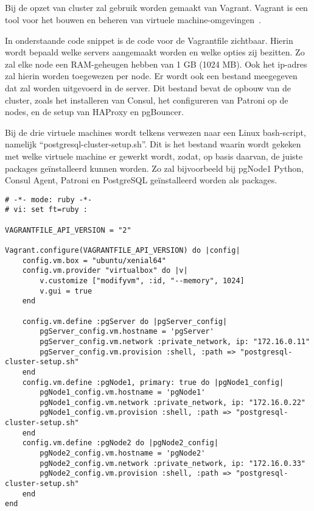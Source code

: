 \subsection{}
\label{subsec:Vagrant}
Bij de opzet van cluster zal gebruik worden gemaakt van Vagrant. Vagrant is een tool voor het bouwen en beheren van virtuele machine-omgevingen~\autocite{Kalow2020}.



In onderstaande code snippet is de code voor de Vagrantfile zichtbaar. Hierin wordt bepaald welke servers aangemaakt worden en welke opties zij bezitten. Zo zal elke node een RAM-geheugen hebben van 1 GB (1024 MB). Ook het ip-adres zal hierin worden toegewezen per node. Er wordt ook een bestand meegegeven dat zal worden uitgevoerd in de server. Dit bestand bevat de opbouw van de cluster, zoals het installeren van Consul, het configureren van Patroni op de nodes, en de setup van HAProxy en pgBouncer.

Bij de drie virtuele machines wordt telkens verwezen naar een Linux bash-script, namelijk “postgresql-cluster-setup.sh”. Dit is het bestand waarin wordt gekeken met welke virtuele machine er gewerkt wordt, zodat, op basis daarvan, de juiste packages geïnstalleerd kunnen worden. Zo zal bijvoorbeeld bij pgNode1 Python, Consul Agent, Patroni en PostgreSQL geïnstalleerd worden als packages.

\begin{lstlisting}
# -*- mode: ruby -*-
# vi: set ft=ruby :

VAGRANTFILE_API_VERSION = "2"

Vagrant.configure(VAGRANTFILE_API_VERSION) do |config|
    config.vm.box = "ubuntu/xenial64"
    config.vm.provider "virtualbox" do |v|
        v.customize ["modifyvm", :id, "--memory", 1024]
        v.gui = true
    end

    config.vm.define :pgServer do |pgServer_config|
        pgServer_config.vm.hostname = 'pgServer'
        pgServer_config.vm.network :private_network, ip: "172.16.0.11"
        pgServer_config.vm.provision :shell, :path => "postgresql-cluster-setup.sh"
    end
    config.vm.define :pgNode1, primary: true do |pgNode1_config|
        pgNode1_config.vm.hostname = 'pgNode1'
        pgNode1_config.vm.network :private_network, ip: "172.16.0.22"
        pgNode1_config.vm.provision :shell, :path => "postgresql-cluster-setup.sh"
    end
    config.vm.define :pgNode2 do |pgNode2_config|
        pgNode2_config.vm.hostname = 'pgNode2'
        pgNode2_config.vm.network :private_network, ip: "172.16.0.33"
        pgNode2_config.vm.provision :shell, :path => "postgresql-cluster-setup.sh"
    end
end
\end{lstlisting}

